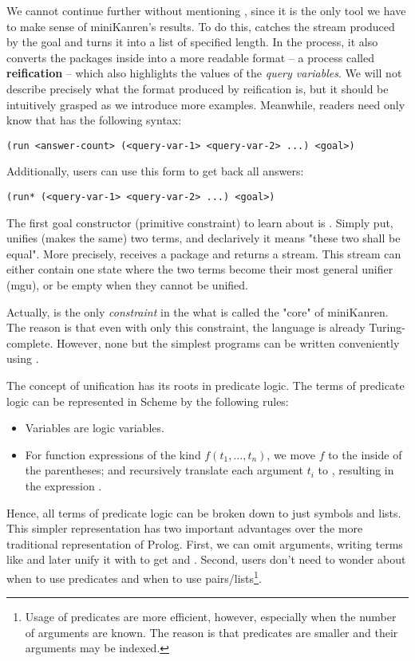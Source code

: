 We cannot continue further without mentioning , since it is the only tool we have to make sense of miniKanren's results. To do this,  catches the stream produced by the goal and turns it into a list of specified length. In the process, it also converts the packages inside into a more readable format -- a process called \textbf{reification} -- which also highlights the values of the \textit{query variables}. We will not describe precisely what the format produced by reification is, but it should be intuitively grasped as we introduce more examples. Meanwhile, readers need only know that  has the following syntax:
\lstset{language=Scheme, showstringspaces=false, breaklines=true}
\begin{lstlisting}
(run <answer-count> (<query-var-1> <query-var-2> ...) <goal>)
\end{lstlisting}

Additionally, users can use this form to get back all answers:
\begin{lstlisting}
(run* (<query-var-1> <query-var-2> ...) <goal>)
\end{lstlisting}

The first goal constructor (primitive constraint) to learn about is \code{==}.
Simply put, \code{==} unifies (makes the same) two terms, and declarively it means "these two shall be equal". More precisely, \code{==} receives a package and returns a stream. This stream can either contain one state where the two terms become their most general unifier (mgu), or be empty when they cannot be unified.

Actually, \code{==} is the only \textit{constraint} in the what is called the "core" of miniKanren. The reason is that even with only this constraint, the language is already Turing-complete. However, none but the simplest programs can be written conveniently using \code{==}.

The concept of unification has its roots in predicate logic. The terms of predicate logic can be represented in Scheme by the following rules:
\begin{itemize}
\item Variables are logic variables.
\item For function expressions of the kind $f(t_1,...,t_n)$, we move $f$ to the inside of the parentheses; and recursively translate each argument $t_i$ to , resulting in the expression .
\end{itemize}

Hence, all terms of predicate logic can be broken down to just symbols and lists. This simpler representation has two important advantages over the more traditional representation of Prolog. First, we can omit arguments, writing terms like  and later unify it with  to get  and . Second, users don't need to wonder about when to use predicates and when to use pairs/lists\footnote{Usage of predicates are more efficient, however, especially when the number of arguments are known. The reason is that predicates are smaller and their arguments may be indexed.}.

